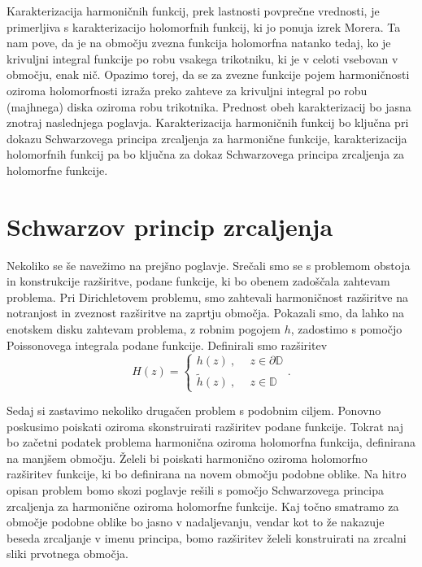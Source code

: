 \documentclass[mat1, tisk]{fmfdelo}
\begin{document}
    Karakterizacija harmoničnih funkcij, prek lastnosti povprečne vrednosti, je primerljiva s karakterizacijo holomorfnih funkcij, ki jo ponuja izrek Morera. 
    Ta nam pove, da je na območju zvezna funkcija holomorfna natanko tedaj, ko je krivuljni integral funkcije po robu vsakega trikotniku, ki je v celoti vsebovan v območju, enak nič.
    Opazimo torej, da se za zvezne funkcije pojem harmoničnosti oziroma holomorfnosti izraža preko zahteve za krivuljni integral po robu (majhnega) diska oziroma robu trikotnika.
    Prednost obeh karakterizacij bo jasna znotraj naslednjega poglavja. Karakterizacija harmoničnih funkcij bo ključna pri dokazu Schwarzovega principa zrcaljenja za harmonične funkcije, 
    karakterizacija holomorfnih funkcij pa bo ključna za dokaz Schwarzovega principa zrcaljenja za holomorfne funkcije. 


\section{Schwarzov princip zrcaljenja}

Nekoliko se še navežimo na prejšno poglavje. 
Srečali smo se s problemom obstoja in konstrukcije razširitve, podane funkcije, ki bo obenem zadoščala zahtevam problema.  
Pri Dirichletovem problemu, smo zahtevali harmoničnost razširitve na notranjost in zveznost razširitve na zaprtju območja. 
Pokazali smo, da lahko na enotskem disku zahtevam problema, z robnim pogojem $h$, zadostimo s pomočjo Poissonovega integrala podane funkcije. Definirali smo razširitev
$$
    H(z) = 
    \begin{cases}
        h(z)~,~~&z \in \partial \mathbb{D} \\
        \widetilde{h}(z)~,~~&z \in \mathbb{D}
    \end{cases}.
$$

Sedaj si zastavimo nekoliko drugačen problem s podobnim ciljem. Ponovno poskusimo poiskati oziroma skonstruirati razširitev podane funkcije. 
Tokrat naj bo začetni podatek problema harmonična oziroma holomorfna funkcija, definirana na manjšem območju. Želeli bi poiskati harmonično oziroma holomorfno razširitev funkcije, ki bo definirana na novem območju podobne oblike.
Na hitro opisan problem bomo skozi poglavje rešili s pomočjo Schwarzovega principa zrcaljenja za harmonične oziroma holomorfne funkcije. 
Kaj točno smatramo za območje podobne oblike bo jasno v nadaljevanju, vendar kot to že nakazuje beseda zrcaljanje v imenu principa, bomo razširitev želeli konstruirati na zrcalni sliki prvotnega območja. 
\end{document}
